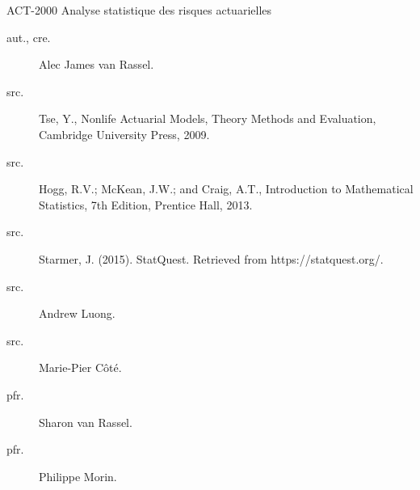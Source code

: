 \begin{contrib}{ACT-2000\: Analyse statistique des risques actuarielles}
\begin{description}
	\item[aut., cre.] Alec James van Rassel.
	\item[src.]	Tse, Y., Nonlife Actuarial Models, Theory Methods and Evaluation, Cambridge University Press, 2009.
	\item[src.]	Hogg, R.V.; McKean, J.W.; and Craig, A.T., Introduction to Mathematical Statistics, 7th Edition, Prentice Hall, 2013.
	\item[src.]	Starmer, J. (2015). StatQuest. Retrieved from https://statquest.org/.
	\item[src.]	Andrew Luong.
	\item[src.]	Marie-Pier Côté.
	\item[pfr.]	Sharon van Rassel.
	\item[pfr.]	Philippe Morin.
\end{description}
\end{contrib}
